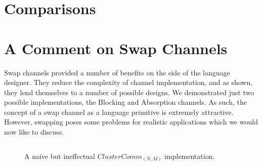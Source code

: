 \section{Comparisons}\label{sec:results-comparisons}




\section{A Comment on Swap Channels}\label{sec:results-swap-channels}

Swap channels provided a number of benefits on the side of the language 
designer. They reduce the complexity of channel implementation, and as shown, 
they lend themselves to a number of possible designs. We demonstrated just two 
possible implementations, the Blocking and Absorption channels. As such, the 
concept of a swap channel as a language primitive is extremely attractive. 
However, swapping poses some problems for realistic applications which we would
now like to discuss.

\begin{figure}
\centering
\inputminted[frame=lines,fontsize=\footnotesize]{csharp}{code/badclustercomm.els}
\caption{A naive but ineffectual $ClusterComm_{(N,M)}$ implementation.} 
\label{fig:bad-clustercomm}
\end{figure}

